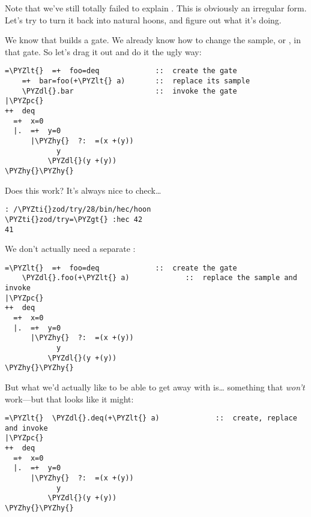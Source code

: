 Note that we've still totally failed to explain .  This
is obviously an irregular form.  Let's try to turn it back into
natural hoons, and figure out what it's doing.

We know that  builds a gate.  We already know how to change
the sample, \kode{+\textless{}} or , in that gate.  So let's drag it out 
and do it the ugly way:
\begin{framed_shaded}
\begin{Verbatim}[fontsize=\relsize{-2.5},fontseries=b,commandchars=\\\{\}]
=\PYZlt{}  =+  foo=deq             ::  create the gate
    =+  bar=foo(+\PYZlt{} a)       ::  replace its sample
    \PYZdl{}.bar                   ::  invoke the gate
|\PYZpc{}
++  deq
  =+  x=0
  |.  =+  y=0
      |\PYZhy{}  ?:  =(x +(y))
            y
          \PYZdl{}(y +(y))
\PYZhy{}\PYZhy{}
\end{Verbatim}
\end{framed_shaded}

Does this work?  It's always nice to check\ldots{}

\begin{framed_shaded}
\begin{Verbatim}[fontsize=\relsize{-2.5},fontseries=b,commandchars=\\\{\}]
: /\PYZti{}zod/try/28/bin/hec/hoon
\PYZti{}zod/try=\PYZgt{} :hec 42
41
\end{Verbatim}
\end{framed_shaded}
We don't actually need a separate :
\begin{framed_shaded}
\begin{Verbatim}[fontsize=\relsize{-2.5},fontseries=b,commandchars=\\\{\}]
=\PYZlt{}  =+  foo=deq             ::  create the gate
    \PYZdl{}.foo(+\PYZlt{} a)             ::  replace the sample and invoke
|\PYZpc{}
++  deq
  =+  x=0
  |.  =+  y=0
      |\PYZhy{}  ?:  =(x +(y))
            y
          \PYZdl{}(y +(y))
\PYZhy{}\PYZhy{}
\end{Verbatim}
\end{framed_shaded}

But what we'd actually like to be able to get away with is\ldots{}
something that \emph{won't} work---but that looks like it might:
\begin{framed_shaded}
\begin{Verbatim}[fontsize=\relsize{-2.5},fontseries=b,commandchars=\\\{\}]
=\PYZlt{}  \PYZdl{}.deq(+\PYZlt{} a)             ::  create, replace and invoke
|\PYZpc{}
++  deq
  =+  x=0
  |.  =+  y=0
      |\PYZhy{}  ?:  =(x +(y))
            y
          \PYZdl{}(y +(y))
\PYZhy{}\PYZhy{}
\end{Verbatim}
\end{framed_shaded}

